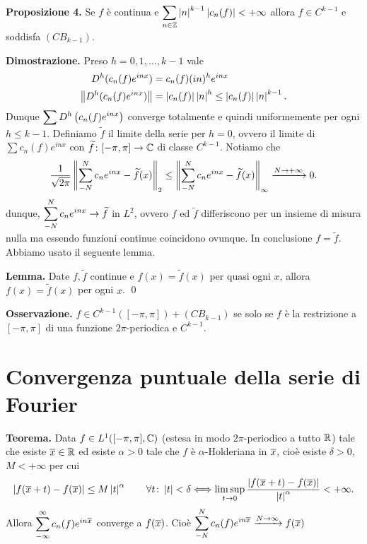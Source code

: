 \textbf{Proposizione 4.} Se $f$ è continua e $\displaystyle \sum_{n \in \mathbb Z} \left| n \right|^{k-1} \left| c_n(f) \right| < +\infty $ allora $f \in C^{k-1}$ e soddisfa $(CB_{k-1})$.

\textbf{Dimostrazione.} Preso $h=0,1,\ldots,k-1$ vale
\begin{align*}
	D^h (c_n(f) e^{inx}) & = c_n(f) (in)^h e^{inx} \\
	\left\lVert D^h (c_n(f) e^{inx}) \right\rVert & = \left| c_n(f) \right| \left| n \right|^h \leq \left| c_n(f) \right| \left| n \right|^{k-1}.
\end{align*}
Dunque $\displaystyle \sum D^h \left( c_n(f) e^{inx} \right)$ converge totalmente e quindi uniformemente per ogni $h \leq k-1$. Definiamo $\tilde{f}$ il limite della serie per $h=0$, ovvero il limite di $\sum c_n(f) e^{inx}$ con $\widetilde{f} \colon  [-\pi,\pi] \to \mathbb C$ di classe $C^{k-1}$.
Notiamo che
%
$$
	\frac{1}{\sqrt{2\pi} } \left\lVert \sum_{-N}^N c_n e^{inx} - \widetilde{f}(x) \right\rVert_2
\leq \left\lVert \sum_{-N}^N c_n e^{inx} - \widetilde{f}(x) \right\rVert_\infty \xrightarrow{N \rightarrow +\infty} 0.
$$
%
dunque, $\displaystyle \sum_{-N}^N c_n e^{inx} \to \widetilde{f}$ in $L^2$, ovvero $f$ ed $\tilde{f}$ differiscono per un insieme di misura nulla ma essendo funzioni continue coincidono ovunque. In conclusione $f = \tilde{f}$. Abbiamo usato il seguente lemma.

\textbf{Lemma.} Date $f,\tilde{f}$ continue e $f(x) = \tilde{f}(x)$ per quasi ogni $x$, allora  $f(x) = \tilde{f}(x)$ per ogni $x$.
\qed

\vs

\textbf{Osservazione.} $f \in C^{k-1}([-\pi,\pi]) + (CB_{k-1})$ se solo se $f $ è la restrizione a $[-\pi,\pi]$ di una funzione $2\pi$-periodica e $C^{k-1}$.


\section{Convergenza puntuale della serie di Fourier}

\textbf{Teorema.} Data $f \in L^1([-\pi,\pi], \mathbb C) $ (estesa in modo $2\pi$-periodico a tutto $\mathbb R$) tale che esiste $\overline{x} \in \mathbb R$ ed esiste $\alpha > 0$ tale che $f$ è $\alpha$-Holderiana in $\overline{x}$, cioè esiste $\delta > 0 $, $M < +\infty$ per cui
%
$$
\left| f(\overline{x} +t) - f(\overline{x}) \right| \leq M \left| t \right|^\alpha \qquad \forall t \colon \left| t \right| < \delta \Longleftrightarrow \limsup_{t \to 0} \frac{\left| f(\overline{x} + t) - f(\overline{x}) \right|}{\left| t \right|^\alpha } < +\infty.
$$
%
Allora $\displaystyle \sum_{-\infty}^\infty c_n(f) e^{in\overline{x}}$ converge a $f(\overline{x})$.
Cioè $\displaystyle \sum_{-N}^N c_n(f) e^{in\overline{x}}\xrightarrow{N \to \infty} f(\overline{x})$ 

